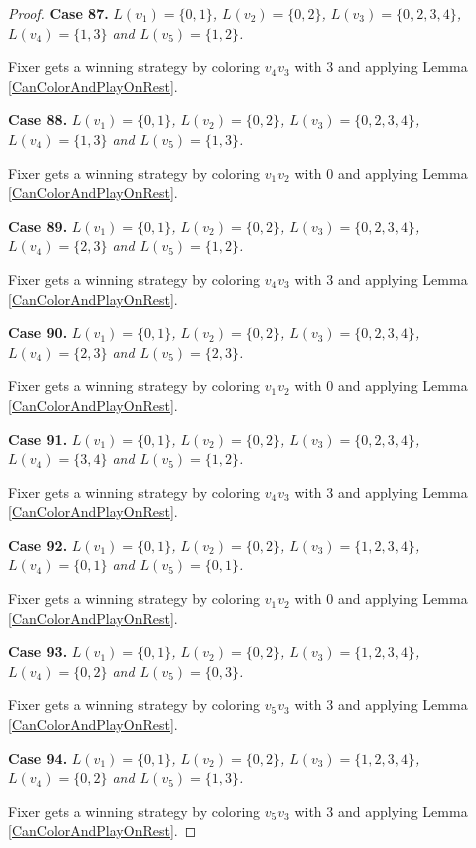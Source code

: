 \documentclass[12pt]{amsart}
\theoremstyle{plain}
\theoremstyle{definition}
\theoremstyle{remark}
\begin{document}
\begin{proof}
\noindent\textbf{Case 87.  }\textit{$L(v_1) = \{0, 1\}$, $L(v_2) = \{0, 2\}$, $L(v_3) = \{0, 2, 3, 4\}$, $L(v_4) = \{1, 3\}$ and $L(v_5) = \{1, 2\}$.}

Fixer gets a winning strategy by coloring $v_4v_3$ with $3$ and applying Lemma \ref{CanColorAndPlayOnRest}.

\noindent\textbf{Case 88.  }\textit{$L(v_1) = \{0, 1\}$, $L(v_2) = \{0, 2\}$, $L(v_3) = \{0, 2, 3, 4\}$, $L(v_4) = \{1, 3\}$ and $L(v_5) = \{1, 3\}$.}

Fixer gets a winning strategy by coloring $v_1v_2$ with $0$ and applying Lemma \ref{CanColorAndPlayOnRest}.

\noindent\textbf{Case 89.  }\textit{$L(v_1) = \{0, 1\}$, $L(v_2) = \{0, 2\}$, $L(v_3) = \{0, 2, 3, 4\}$, $L(v_4) = \{2, 3\}$ and $L(v_5) = \{1, 2\}$.}

Fixer gets a winning strategy by coloring $v_4v_3$ with $3$ and applying Lemma \ref{CanColorAndPlayOnRest}.

\noindent\textbf{Case 90.  }\textit{$L(v_1) = \{0, 1\}$, $L(v_2) = \{0, 2\}$, $L(v_3) = \{0, 2, 3, 4\}$, $L(v_4) = \{2, 3\}$ and $L(v_5) = \{2, 3\}$.}

Fixer gets a winning strategy by coloring $v_1v_2$ with $0$ and applying Lemma \ref{CanColorAndPlayOnRest}.

\noindent\textbf{Case 91.  }\textit{$L(v_1) = \{0, 1\}$, $L(v_2) = \{0, 2\}$, $L(v_3) = \{0, 2, 3, 4\}$, $L(v_4) = \{3, 4\}$ and $L(v_5) = \{1, 2\}$.}

Fixer gets a winning strategy by coloring $v_4v_3$ with $3$ and applying Lemma \ref{CanColorAndPlayOnRest}.

\noindent\textbf{Case 92.  }\textit{$L(v_1) = \{0, 1\}$, $L(v_2) = \{0, 2\}$, $L(v_3) = \{1, 2, 3, 4\}$, $L(v_4) = \{0, 1\}$ and $L(v_5) = \{0, 1\}$.}

Fixer gets a winning strategy by coloring $v_1v_2$ with $0$ and applying Lemma \ref{CanColorAndPlayOnRest}.

\noindent\textbf{Case 93.  }\textit{$L(v_1) = \{0, 1\}$, $L(v_2) = \{0, 2\}$, $L(v_3) = \{1, 2, 3, 4\}$, $L(v_4) = \{0, 2\}$ and $L(v_5) = \{0, 3\}$.}

Fixer gets a winning strategy by coloring $v_5v_3$ with $3$ and applying Lemma \ref{CanColorAndPlayOnRest}.

\noindent\textbf{Case 94.  }\textit{$L(v_1) = \{0, 1\}$, $L(v_2) = \{0, 2\}$, $L(v_3) = \{1, 2, 3, 4\}$, $L(v_4) = \{0, 2\}$ and $L(v_5) = \{1, 3\}$.}

Fixer gets a winning strategy by coloring $v_5v_3$ with $3$ and applying Lemma \ref{CanColorAndPlayOnRest}.


\end{proof}
\end{document}
